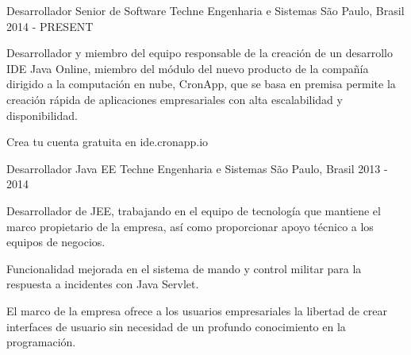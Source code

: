 

\begin{cventries}

  \cventry
    {Desarrollador Senior de Software} %
    {Techne Engenharia e Sistemas} %
    {São Paulo, Brasil} %
    {2014 - PRESENT} %
    {
      \begin{cvitems} %
        \item {Desarrollador y miembro del equipo responsable de la creación de un desarrollo IDE Java Online, miembro del módulo del nuevo producto de la compañía dirigido a la computación en nube, CronApp, que se basa en premisa permite la creación rápida de aplicaciones empresariales con alta escalabilidad y disponibilidad.}
        \item {Crea tu cuenta gratuita en ide.cronapp.io}
      \end{cvitems}
    }

  \cventry
    {Desarrollador Java EE} %
    {Techne Engenharia e Sistemas} %
    {São Paulo, Brasil} %
    {2013 - 2014} %
    {
      \begin{cvitems} %
        \item {Desarrollador de JEE, trabajando en el equipo de tecnología que mantiene el marco propietario de la empresa, así como proporcionar apoyo técnico a los equipos de negocios.}
        \item {Funcionalidad mejorada en el sistema de mando y control militar para la respuesta a incidentes con Java Servlet.}
        \item {El marco de la empresa ofrece a los usuarios empresariales la libertad de crear interfaces de usuario sin necesidad de un profundo conocimiento en la programación.}
      \end{cvitems}
    }


\end{cventries}
